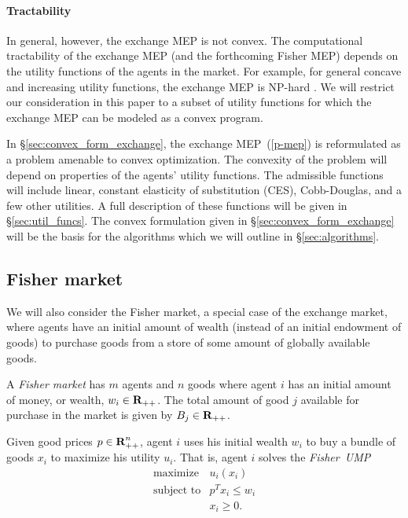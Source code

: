\documentclass[12pt]{article}
\begin{document}
\paragraph{Tractability}
In general, however, the exchange MEP is not convex.
The computational tractability of the exchange MEP
(and the forthcoming Fisher MEP) depends on the utility functions of
the agents in the market.
For example, for general concave and increasing utility functions,
the exchange MEP is NP-hard \cite{codenotti2006leontief}.
We will restrict our consideration in this paper to a subset of utility
functions for which the exchange MEP can be modeled as a convex program.

In \S\ref{sec:convex_form_exchange}, the exchange MEP~(\ref{p-mep})
is reformulated as a problem amenable to convex optimization.
The convexity of the problem will depend on properties of the
agents' utility functions.
The admissible functions will include linear, constant elasticity
of substitution (CES), Cobb-Douglas, and a few other utilities.
A full description of these functions will be given in \S\ref{sec:util_funcs}.
The convex formulation given in \S\ref{sec:convex_form_exchange} will
be the basis for the algorithms which
we will outline in \S\ref{sec:algorithms}.


\subsection{Fisher market}
We will also consider the Fisher market, a special case of the exchange market, where agents have an initial amount of wealth (instead of an initial endowment of goods)
to purchase goods from a store of some amount of globally available goods.


A \emph{Fisher market} has $m$ agents and $n$ goods where
agent $i$ has an initial amount of money, or wealth, $w_i \in {\mbox{\bf R}}_{++}$.
The total amount of good $j$ available for purchase in the market is given by
$B_j \in {\mbox{\bf R}}_{++}$.

Given good prices $p \in {\mbox{\bf R}}^n_{++}$, agent $i$ uses his initial
wealth $w_i$ to buy a bundle of goods $x_i$ to maximize his utility $u_i$.
That is, agent $i$ solves the \emph{Fisher~UMP}
\begin{equation}
\label{p-fisher-ump}
\begin{array}{ll}
\mbox{maximize} & u_i(x_i) \\
\mbox{subject to} & p^T x_i \leq w_i \\
& x_i \geq 0.
\end{array}
\end{equation}
\end{document}
